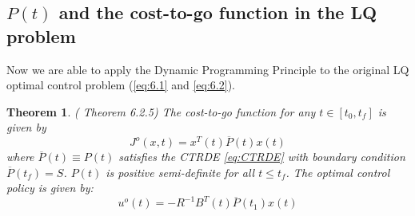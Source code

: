 \documentclass[paper=a4, pagesize, DIV=calc, BCOR=12.5mm, twoside=on, onecolumn=on, open = any, titlepage =on, parskip =half-, headsepline = on, footsepline = on, chapterprefix = on, appendixprefix = off, fontsize = 12pt, numbers = noenddot, abstract = on]{scrbook}
\numberwithin{equation}{chapter}
\theoremstyle{definition}
\theoremstyle{plain}
\theoremstyle{plain}
\newtheorem{satz}{Theorem}
\theoremstyle{remark}
\theoremstyle{plain}
\theoremstyle{plain}
\begin{document}
 \subsection{$P(t)$ and the cost-to-go function in the LQ problem}
 \onehalfspacing
 Now we are able to apply the Dynamic Programming Principle to the original LQ optimal control problem (\eqref{eq:6.1} and \eqref{eq:6.2}).
 \newline
\begin{satz} (\cite{li:2006} Theorem 6.2.5) \newline
The cost-to-go function for any $t \in \left[ t_0, t_f \right]$ is given by 
\begin{equation}
J^o(x, t) = x^T(t)\overline{P}(t)x(t) 
\end{equation}
where $\overline{P}(t) \equiv P(t)$ satisfies the CTRDE  \eqref{eq:CTRDE} with boundary condition $\overline{P}(t_f) = S$. $P(t)$ is positive semi-definite for all $t \le t_f$. 
The optimal control policy is given by: 
\[ u^o(t) = -R^{-1}B^T(t)\overline{P}(t_1)x(t)\]
\end{satz}
\end{document}

